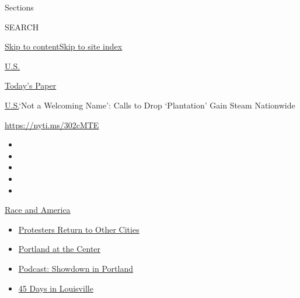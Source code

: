 Sections

SEARCH

\protect\hyperlink{site-content}{Skip to
content}\protect\hyperlink{site-index}{Skip to site index}

\href{https://www.nytimes.com/section/us}{U.S.}

\href{https://myaccount.nytimes.com/auth/login?response_type=cookie\&client_id=vi}{}

\href{https://www.nytimes.com/section/todayspaper}{Today's Paper}

\href{/section/us}{U.S.}\textbar{}`Not a Welcoming Name': Calls to Drop
`Plantation' Gain Steam Nationwide

\url{https://nyti.ms/302cMTE}

\begin{itemize}
\item
\item
\item
\item
\item
\end{itemize}

\href{https://www.nytimes.com/news-event/george-floyd-protests-minneapolis-new-york-los-angeles?action=click\&pgtype=Article\&state=default\&region=TOP_BANNER\&context=storylines_menu}{Race
and America}

\begin{itemize}
\tightlist
\item
  \href{https://www.nytimes.com/2020/07/26/us/protests-portland-seattle-trump.html?action=click\&pgtype=Article\&state=default\&region=TOP_BANNER\&context=storylines_menu}{Protesters
  Return to Other Cities}
\item
  \href{https://www.nytimes.com/2020/07/24/us/portland-oregon-protests-white-race.html?action=click\&pgtype=Article\&state=default\&region=TOP_BANNER\&context=storylines_menu}{Portland
  at the Center}
\item
  \href{https://www.nytimes.com/2020/07/23/podcasts/the-daily/portland-protests.html?action=click\&pgtype=Article\&state=default\&region=TOP_BANNER\&context=storylines_menu}{Podcast:
  Showdown in Portland}
\item
  \href{https://www.nytimes.com/interactive/2020/07/16/us/black-lives-matter-protests-louisville-breonna-taylor.html?action=click\&pgtype=Article\&state=default\&region=TOP_BANNER\&context=storylines_menu}{45
  Days in Louisville}
\end{itemize}

